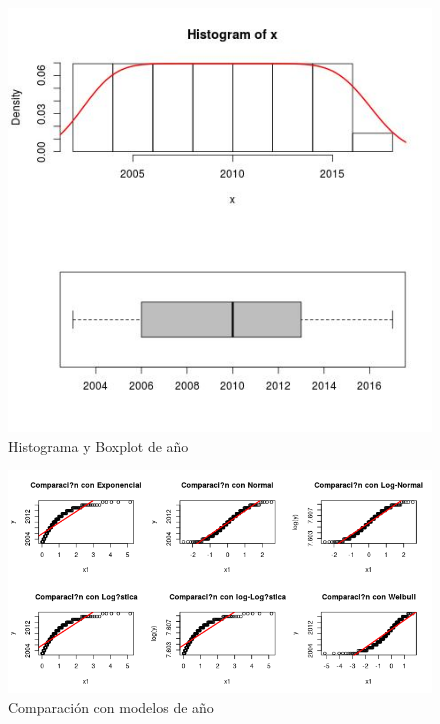 \documentclass{article}
\begin{document}
\begin{figure}[h!]
\centering
\includegraphics[scale=0.5]{./plots/histplot_a_o.png}
\caption{Histograma y Boxplot de año}
\end{figure}

\begin{figure}[h!]
\centering
\includegraphics[scale=0.5]{./plots/cm_a_o.png}
\caption{Comparación con modelos de año}
\end{figure}
\end{document}
